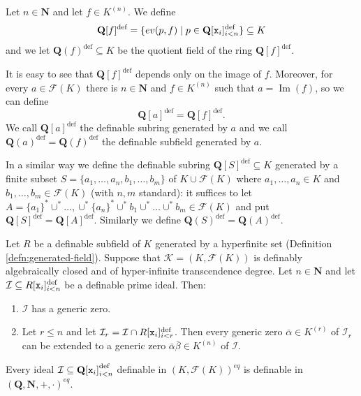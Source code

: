 \documentclass[10pt,a4paper]{amsart}
\newcommand{\F}{\mathcal{F}}
\newcommand{\ca}{\mathcal}
\newcommand{\ev}{\textnormal{ev}}
\newcommand{\hQ}{\mathbf Q}
\newcommand{\hn}{\mathbf N}
\newcommand{\ideal}[1]{\ca #1}
\newcommand{\img}{\operatorname{Im}}
\newcommand{\polyn}[2]{{#1}[{\tt x}_i]_{i<#2}^\text{def}}
\newcommand{\poly}[1]{{\hQ[{\tt x}_i]}_{i<#1}^\text{def}}
\begin{document}
\begin{defn}\label{defn:generated-field}
Let $n\in \hn$ and let $f\in K^{(n)}$. We define 
$$\hQ[f]^{\text{def}} = \{\ev(p, f) \mid p\in \polyn {\hQ} n\} \subseteq K$$ 
and we let $\hQ(f)^{\text{def}} \subseteq K$ be the quotient field of the ring $\hQ[f]^{\text{def}}$. 

It is easy to see that $\hQ[f]^{\text{def}}$ depends only on the image of $f$. Moreover, for every $a\in \F(K)$ there is $n\in \hn$ and $f\in K^{(n)}$ such that $a = \img(f)$, so we can define 
$$\hQ[a]^{\text{def}} = \hQ[f]^{\text{def}}.$$ We call $\hQ[a]^{\text{def}}$ the definable subring generated by $a$ and we call $\hQ(a)^{\text{def}} = \hQ(f)^{\text{def}}$ the definable subfield generated by $a$. 

In a similar way we define the definable subring $\hQ[S]^{\text{def}} \subseteq K$ generated by a finite subset $S = \{a_1, \ldots, a_n, b_1, \ldots, b_m\}$ of $K\cup \F(K)$ where $a_1, \ldots, a_n\in K$ and $b_1, \ldots, b_m\in \F(K)$ (with $n,m$ standard): it suffices to let $A = \{a_1\}^* \cup^* \ldots, \cup^* \{a_n\}^* \cup^* b_1 \cup^* \ldots \cup^* b_m \in \F(K)$
and put $\hQ[S]^{\text{def}} = \hQ[A]^{\text{def}}$. Similarly we define $\hQ(S)^{\text{def}} = \hQ(A)^{\text{def}}$. 
\end{defn}

\begin{prop} \label{prop:generic} Let $R$ be a definable subfield of $K$ generated by a hyperfinite set (Definition \ref{defn:generated-field}). Suppose that $\ca K = (K, \F(K))$ is definably algebraically closed and of hyper-infinite transcendence degree. 
Let $n\in \hn$ and let $\ideal I \subseteq \polyn R n$ be a definable prime ideal. Then:  
\begin{enumerate}
\item 
$\ideal I$ has a generic zero. 
\item Let $r\leq n$ and let ${\ideal I}_r = \ideal I \cap \polyn R r$. Then every generic zero $\bar \alpha \in K^{(r)}$ of ${\ideal I}_r$ can be extended to a generic zero $\bar \alpha \bar \beta \in K^{(n)}$ of $\ideal I$. 
\end{enumerate}
\end{prop}

\begin{cor} \label{cor:ideal}  
Every ideal $\ideal I \subseteq \poly n$ definable in $(K, \F(K))^{eq}$ is definable in $(\hQ, \hn,+,\cdot)^{eq}$. 
\end{cor} 
\end{document}
